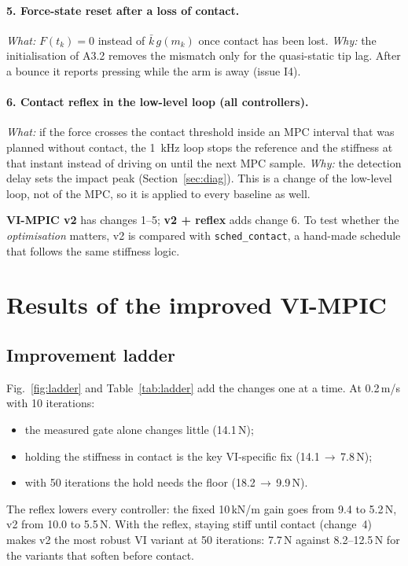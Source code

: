 \documentclass[11pt,a4paper]{article}
\newcommand{\kb}{\bar{k}}
\begin{document}
\paragraph{5. Force-state reset after a loss of contact.}
\emph{What:} $F(t_k)=0$ instead of $\kb\,g(m_k)$ once contact has been lost. \emph{Why:} the
initialisation of A3.2 removes the mismatch only for the quasi-static tip lag. After a bounce it reports
pressing while the arm is away (issue I4).

\paragraph{6. Contact reflex in the low-level loop (all controllers).}
\emph{What:} if the force crosses the contact threshold inside an MPC interval that was planned without
contact, the \SI{1}{kHz} loop stops the reference and the stiffness at that instant instead of driving on
until the next MPC sample. \emph{Why:} the detection delay sets the impact peak (Section~\ref{sec:diag}).
This is a change of the low-level loop, not of the MPC, so it is applied to every baseline as well.

\medskip
\textbf{VI-MPIC v2} has changes 1--5; \textbf{v2 + reflex} adds change 6. To test whether the
\emph{optimisation} matters, v2 is compared with \texttt{sched\_contact}, a hand-made schedule that
follows the same stiffness logic.

\section{Results of the improved VI-MPIC}\label{sec:v2res}

\subsection{Improvement ladder}
Fig.~\ref{fig:ladder} and Table~\ref{tab:ladder} add the changes one at a time. At 0.2\,m/s with 10 iterations:
\begin{itemize}[leftmargin=14pt]
\item the measured gate alone changes little (14.1\,N);
\item holding the stiffness in contact is the key VI-specific fix (14.1\,$\to$\,7.8\,N);
\item with 50 iterations the hold needs the floor (18.2\,$\to$\,9.9\,N).
\end{itemize}
The reflex lowers every controller: the fixed 10\,kN/m gain goes from 9.4 to 5.2\,N, v2 from 10.0 to
5.5\,N. With the reflex, staying stiff until contact (change~4) makes v2 the most robust VI variant at 50
iterations: 7.7\,N against 8.2--12.5\,N for the variants that soften before contact.
\end{document}
